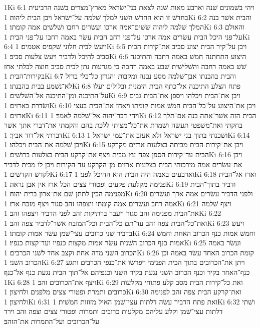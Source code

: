 1Ki 6:1  ויהי בשׁמונים שׁנה וארבע מאות שׁנה לצאת בני־ישׂראל מארץ־מצרים בשׁנה הרביעית בחדשׁ זו הוא החדשׁ השׁני למלך שׁלמה על־ישׂראל ויבן הבית ליהוה׃
1Ki 6:2  והבית אשׁר בנה המלך שׁלמה ליהוה שׁשׁים־אמה ארכו ועשׂרים רחבו ושׁלשׁים אמה קומתו׃
1Ki 6:3  והאולם על־פני היכל הבית עשׂרים אמה ארכו על־פני רחב הבית עשׂר באמה רחבו על־פני הבית׃
1Ki 6:4  ויעשׂ לבית חלוני שׁקפים אטמים׃
1Ki 6:5  ויבן על־קיר הבית יצוע סביב את־קירות הבית סביב להיכל ולדביר ויעשׂ צלעות סביב׃
1Ki 6:6  היצוע התחתנה חמשׁ באמה רחבה והתיכנה שׁשׁ באמה רחבה והשׁלישׁית שׁבע באמה רחבה כי מגרעות נתן לבית סביב חוצה לבלתי אחז בקירות־הבית׃
1Ki 6:7  והבית בהבנתו אבן־שׁלמה מסע נבנה ומקבות והגרזן כל־כלי ברזל לא־נשׁמע בבית בהבנתו׃
1Ki 6:8  פתח הצלע התיכנה אל־כתף הבית הימנית ובלולים יעלו על־התיכנה ומן־התיכנה אל־השׁלשׁים׃
1Ki 6:9  ויבן את־הבית ויכלהו ויספן את־הבית גבים ושׂדרת בארזים׃
1Ki 6:10  ויבן את־היצוע על־כל־הבית חמשׁ אמות קומתו ויאחז את־הבית בעצי ארזים׃
1Ki 6:11  ויהי דבר־יהוה אל־שׁלמה לאמר׃
1Ki 6:12  הבית הזה אשׁר־אתה בנה אם־תלך בחקתי ואת־משׁפטי תעשׂה ושׁמרת את־כל־מצותי ללכת בהם והקמתי את־דברי אתך אשׁר דברתי אל־דוד אביך׃
1Ki 6:13  ושׁכנתי בתוך בני ישׂראל ולא אעזב את־עמי ישׂראל׃
1Ki 6:14  ויבן שׁלמה את־הבית ויכלהו׃
1Ki 6:15  ויבן את־קירות הבית מביתה בצלעות ארזים מקרקע הבית עד־קירות הספן צפה עץ מבית ויצף את־קרקע הבית בצלעות ברושׁים׃
1Ki 6:16  ויבן את־עשׂרים אמה מירכותי הבית בצלעות ארזים מן־הקרקע עד־הקירות ויבן לו מבית לדביר לקדשׁ הקדשׁים׃
1Ki 6:17  וארבעים באמה היה הבית הוא ההיכל לפני׃
1Ki 6:18  וארז אל־הבית פנימה מקלעת פקעים ופטורי צצים הכל ארז אין אבן נראה׃
1Ki 6:19  ודביר בתוך־הבית מפנימה הכין לתתן שׁם את־ארון ברית יהוה׃
1Ki 6:20  ולפני הדביר עשׂרים אמה ארך ועשׂרים אמה רחב ועשׂרים אמה קומתו ויצפהו זהב סגור ויצף מזבח ארז׃
1Ki 6:21  ויצף שׁלמה את־הבית מפנימה זהב סגור ויעבר ברתיקות זהב לפני הדביר ויצפהו זהב׃
1Ki 6:22  ואת־כל־הבית צפה זהב עד־תם כל־הבית וכל־המזבח אשׁר־לדביר צפה זהב׃
1Ki 6:23  ויעשׂ בדביר שׁני כרובים עצי־שׁמן עשׂר אמות קומתו׃
1Ki 6:24  וחמשׁ אמות כנף הכרוב האחת וחמשׁ אמות כנף הכרוב השׁנית עשׂר אמות מקצות כנפיו ועד־קצות כנפיו׃
1Ki 6:25  ועשׂר באמה הכרוב השׁני מדה אחת וקצב אחד לשׁני הכרבים׃
1Ki 6:26  קומת הכרוב האחד עשׂר באמה וכן הכרוב השׁני׃
1Ki 6:27  ויתן את־הכרובים בתוך הבית הפנימי ויפרשׂו את־כנפי הכרבים ותגע כנף־האחד בקיר וכנף הכרוב השׁני נגעת בקיר השׁני וכנפיהם אל־תוך הבית נגעת כנף אל־כנף׃
1Ki 6:28  ויצף את־הכרובים זהב׃
1Ki 6:29  ואת כל־קירות הבית מסב קלע פתוחי מקלעות כרובים ותמרת ופטורי צצים מלפנים ולחיצון׃
1Ki 6:30  ואת־קרקע הבית צפה זהב לפנימה ולחיצון׃
1Ki 6:31  ואת פתח הדביר עשׂה דלתות עצי־שׁמן האיל מזוזות חמשׁית׃
1Ki 6:32  ושׁתי דלתות עצי־שׁמן וקלע עליהם מקלעות כרובים ותמרות ופטורי צצים וצפה זהב וירד על־הכרובים ועל־התמרות את־הזהב׃
